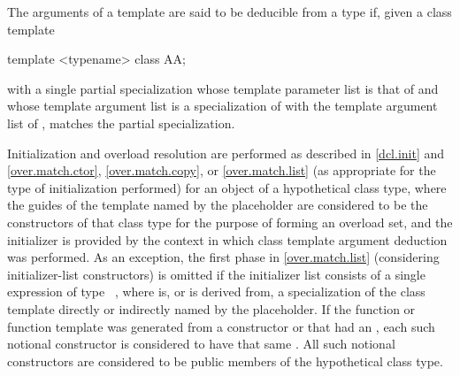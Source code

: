 %
\pnum
The arguments of a template  are said to be
deducible from a type  if, given a class template
\begin{codeblock}
template <typename> class AA;
\end{codeblock}
with a single partial specialization
whose template parameter list is that of  and
whose template argument list is a specialization of 
with the template argument list of ,
 matches the partial specialization.

\pnum
Initialization and overload resolution are performed as described
in \ref{dcl.init} and \ref{over.match.ctor}, \ref{over.match.copy},
or \ref{over.match.list} (as appropriate for the type of initialization
performed) for an object of a hypothetical class type, where
the guides of the template named by the placeholder are considered to be the
constructors of that class type for the purpose of forming an overload
set, and the initializer is provided by the context in which class
template argument deduction was performed.
As an exception, the first phase in \ref{over.match.list}
(considering initializer-list constructors)
is omitted if the initializer list consists of
a single expression of type \cv{}~,
where  is, or is derived from,
a specialization of the class template
directly or indirectly named by the placeholder.
If the function or function template was generated from
a constructor or 
that had an ,
each such notional constructor is considered to have
that same .
All such notional constructors are considered to be
public members of the hypothetical class type.


